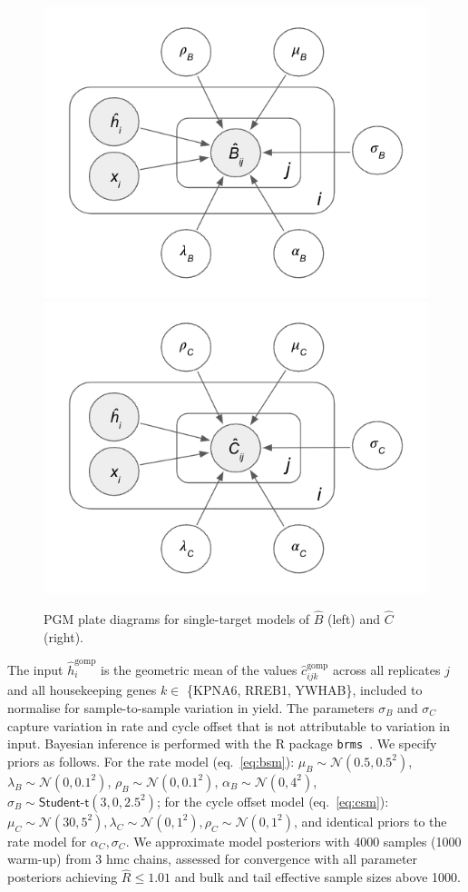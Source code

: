 \documentclass[../thesis.tex]{subfiles}
\begin{document}
\begin{figure}
    \centering
    \includegraphics[width=.45\textwidth]{figures/chapter2/LAMP_STM_B_PGM.png} \includegraphics[width=.45\textwidth]{figures/chapter2/LAMP_STM_C_PGM.png}
    \caption{PGM plate diagrams for single-target models of $\hat{B}$ (left) and $\hat{C}$ (right).}
    \label{fig:stm_pgms}
\end{figure}
The input $\hat{h}^{\text{gomp}}_{i}$ is the geometric mean of the values $\hat{c}_{ijk}^{\text{gomp}}$ across all replicates $j$ and all housekeeping genes  $k \in$ \{KPNA6, RREB1, YWHAB\}, included to normalise for sample-to-sample variation in  yield. The parameters $\sigma_B$ and $\sigma_C$ capture variation in rate and cycle offset that is not attributable to variation in  input. Bayesian inference is performed with the R package \texttt{brms}~\citep{burkner_brms_2017}. We specify priors as follows. For the rate model (eq.~\ref{eq:bsm}): $\mu_B \sim \mathcal{N}(0.5, 0.5^2)$, $\lambda_B \sim \mathcal{N}(0, 0.1^2)$, $\rho_B \sim \mathcal{N}(0, 0.1^2)$, $\alpha_B \sim \mathcal{N}(0,4^2)$, $\sigma_B \sim \textsf{Student-t}(3, 0, 2.5^2)$; for the cycle offset model (eq.~\ref{eq:csm}): $\mu_C \sim \mathcal{N}(30, 5^2), \lambda_C \sim \mathcal{N}(0, 1^2), \rho_C \sim \mathcal{N}(0, 1^2)$, and identical priors to the rate model for $\alpha_C,\sigma_C$. We approximate model posteriors with 4000 samples (1000 warm-up) from 3 \gls{hmc} chains, assessed for convergence with all parameter posteriors achieving $\hat{R} \leq 1.01$ and bulk and tail effective sample sizes above 1000.
\end{document}
